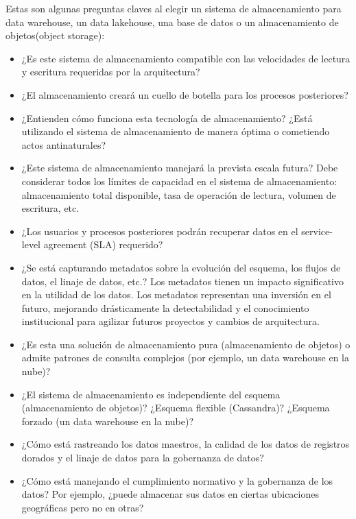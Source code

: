 \documentclass[12pt]{book}
\begin{document}
Estas son algunas preguntas claves al elegir un sistema de almacenamiento para data warehouse, un data lakehouse, una base de datos o un almacenamiento de objetos(object storage):

\begin{itemize}
    \item ¿Es este sistema de almacenamiento compatible con las velocidades de lectura y escritura requeridas por la arquitectura?
    \item ¿El almacenamiento creará un cuello de botella para los procesos posteriores?
    \item ¿Entienden cómo funciona esta tecnología de almacenamiento? ¿Está utilizando el sistema de almacenamiento de manera óptima o cometiendo actos antinaturales? %
    \item ¿Este sistema de almacenamiento manejará la prevista escala futura? Debe considerar todos los límites de capacidad en el sistema de almacenamiento: almacenamiento total disponible, tasa de operación de lectura, volumen de escritura, etc.
    \item ¿Los usuarios y procesos posteriores podrán recuperar datos en el service-level agreement (SLA) requerido?
    \item ¿Se está capturando metadatos sobre la evolución del esquema, los flujos de datos, el linaje de datos, etc.? Los metadatos tienen un impacto significativo en la utilidad de los datos. Los metadatos representan una inversión en el futuro, mejorando drásticamente la detectabilidad y el conocimiento institucional para agilizar futuros proyectos y cambios de arquitectura.
    \item ¿Es esta una solución de almacenamiento pura (almacenamiento de objetos) o admite patrones de consulta complejos (por ejemplo, un data warehouse en la nube)?
    \item ¿El sistema de almacenamiento es independiente del esquema (almacenamiento de objetos)? ¿Esquema flexible (Cassandra)? ¿Esquema forzado (un data warehouse en la nube)?
    \item ¿Cómo está rastreando los datos maestros, la calidad de los datos de registros dorados y el linaje de datos para la gobernanza de datos?
    \item ¿Cómo está manejando el cumplimiento normativo y la gobernanza de los datos? Por ejemplo, ¿puede almacenar sus datos en ciertas ubicaciones geográficas pero no en otras?
\end{itemize}
\end{document}
